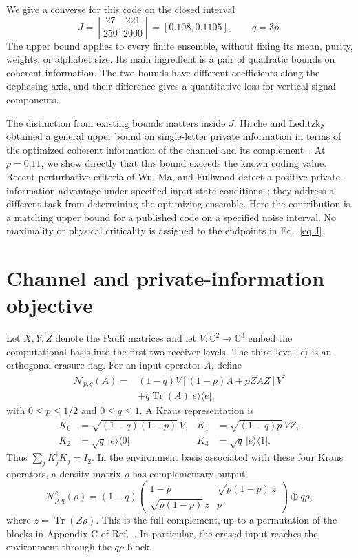 \documentclass[aps,pra,reprint,amsmath,amssymb,longbibliography,nofootinbib]{revtex4-2}
\newcommand{\Tr}{\operatorname{Tr}}
\newcommand{\cN}{\mathcal N}
\begin{document}
We give a converse for this code on the closed interval
\begin{equation}
 J=\left[\frac{27}{250},\frac{221}{2000}\right]
   =[0.108,0.1105],\qquad q=3p.
 \label{eq:J}
\end{equation}
The upper bound applies to every finite ensemble, without fixing its mean, purity, weights, or alphabet size. Its main ingredient is a pair of quadratic bounds on coherent information. The two bounds have different coefficients along the dephasing axis, and their difference gives a quantitative loss for vertical signal components.

The distinction from existing bounds matters inside $J$. Hirche and Leditzky obtained a general upper bound on single-letter private information in terms of the optimized coherent information of the channel and its complement~\cite{HL2022}. At $p=0.11$, we show directly that this bound exceeds the known coding value. Recent perturbative criteria of Wu, Ma, and Fullwood detect a positive private-information advantage under specified input-state conditions~\cite{WMF2025}; they address a different task from determining the optimizing ensemble. Here the contribution is a matching upper bound for a published code on a specified noise interval. No maximality or physical criticality is assigned to the endpoints in Eq.~\eqref{eq:J}.

\section{Channel and private-information objective}
Let $X,Y,Z$ denote the Pauli matrices and let $V:\mathbb C^2\to\mathbb C^3$ embed the computational basis into the first two receiver levels. The third level $|e\rangle$ is an orthogonal erasure flag. For an input operator $A$, define
\begin{align}
 \cN_{p,q}(A)={}&(1-q)V[(1-p)A+pZAZ]V^\dagger\nonumber\\
 &+q\Tr(A)|e\rangle\langle e|,
 \label{eq:channel}
\end{align}
with $0\le p\le1/2$ and $0\le q\le1$. A Kraus representation is
\begin{align}
 K_0&=\sqrt{(1-q)(1-p)}\,V,&
 K_1&=\sqrt{(1-q)p}\,VZ,\nonumber\\
 K_2&=\sqrt q\,|e\rangle\langle0|,&
 K_3&=\sqrt q\,|e\rangle\langle1|.
 \label{eq:kraus}
\end{align}
Thus $\sum_jK_j^\dagger K_j=I_2$. In the environment basis associated with these four Kraus operators, a density matrix $\rho$ has complementary output
\begin{equation}
 \cN^c_{p,q}(\rho)=(1-q)
 \begin{pmatrix}
 1-p&\sqrt{p(1-p)}\,z\\
 \sqrt{p(1-p)}\,z&p
 \end{pmatrix}\oplus q\rho,
 \label{eq:complement}
\end{equation}
where $z=\Tr(Z\rho)$. This is the full complement, up to a permutation of the blocks in Appendix C of Ref.~\cite{LLS2018}. In particular, the erased input reaches the environment through the $q\rho$ block.
\end{document}
